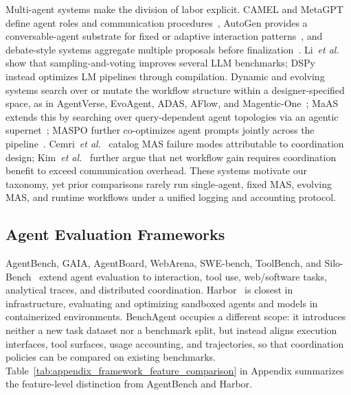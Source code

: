 Multi-agent systems make the division of labor explicit.
CAMEL and MetaGPT define agent roles and communication procedures~\citep{li2023camel,hong2023metagpt}, AutoGen provides a conversable-agent substrate for fixed or adaptive interaction patterns~\citep{wu2023autogen}, and debate-style systems aggregate multiple proposals before finalization~\citep{du2023multiagentdebate,chan2023chateval}.
Li~\emph{et al.}~\citep{li2024moreagents} show that sampling-and-voting improves several LLM benchmarks; DSPy~\citep{khattab2023dspy} instead optimizes LM pipelines through compilation.
Dynamic and evolving systems search over or mutate the workflow structure within a designer-specified space, as in AgentVerse, EvoAgent, ADAS, AFlow, and Magentic-One~\citep{chen2023agentverse,yuan2024evoagent,hu2024adas,zhang2024aflow,fourney2024magenticone}; MaAS extends this by searching over query-dependent agent topologies via an agentic supernet~\citep{zhang2025maas}; MASPO further co-optimizes agent prompts jointly across the pipeline~\citep{wang2026maspo}.
Cemri~\emph{et al.}~\citep{cemri2025maswhyfail} catalog MAS failure modes attributable to coordination design; Kim~\emph{et al.}~\citep{kim2025scaling} further argue that net workflow gain requires coordination benefit to exceed communication overhead.
These systems motivate our taxonomy, yet prior comparisons rarely run single-agent, fixed MAS, evolving MAS, and runtime workflows under a unified logging and accounting protocol.

\subsection{Agent Evaluation Frameworks}
AgentBench, GAIA, AgentBoard, WebArena, SWE-bench, ToolBench, and Silo-Bench~\citep{liu2023agentbench,mialon2023gaia,ma2024agentboard,zhou2023webarena,jimenez2024swebench,qin2023toolbench,zhang2026silobench} extend agent evaluation to interaction, tool use, web/software tasks, analytical traces, and distributed coordination.
Harbor~\citep{harbor_framework} is closest in infrastructure, evaluating and optimizing sandboxed agents and models in containerized environments.
BenchAgent occupies a different scope: it introduces neither a new task dataset nor a benchmark split, but instead aligns execution interfaces, tool surfaces, usage accounting, and trajectories, so that coordination policies can be compared on existing benchmarks.
Table~\ref{tab:appendix_framework_feature_comparison} in Appendix summarizes the feature-level distinction from AgentBench and Harbor.

